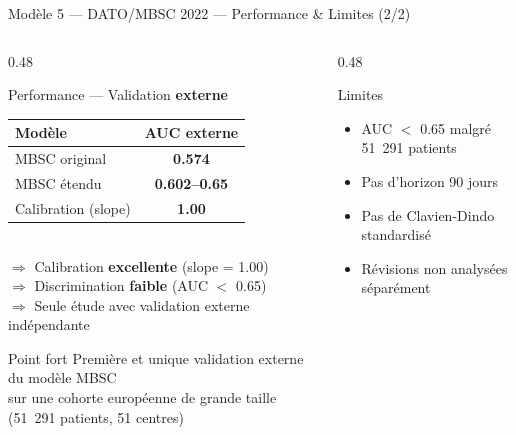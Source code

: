 \documentclass[aspectratio=169]{beamer}
\newcommand{\tightlist}{%
  \setlength{\itemsep}{1pt}\setlength{\parskip}{0pt}%
  \setlength{\parsep}{0pt}\setlength{\topsep}{2pt}}
\begin{document}
\begin{frame}{Modèle 5 --- DATO/MBSC 2022 --- Performance \& Limites (2/2)}
  \begin{columns}[T]
    \begin{column}{0.48\textwidth}
      \begin{block}{Performance --- Validation \textbf{externe}}
        \footnotesize
        \begin{tabular}{lc}
          \toprule
          \textbf{Modèle} & \textbf{AUC externe} \\
          \midrule
          MBSC original       & \textcolor{orangemod}{\textbf{0.574}} \\
          MBSC étendu         & \textcolor{orangemod}{\textbf{0.602--0.65}} \\
          Calibration (slope) & \textcolor{vertdoux}{\textbf{1.00}} \\
          \bottomrule
        \end{tabular}
        \vspace{6pt}\\
        $\Rightarrow$ Calibration \textcolor{vertdoux}{\textbf{excellente}} (slope = 1.00)\\[4pt]
        $\Rightarrow$ Discrimination \textcolor{rougealerte}{\textbf{faible}} (AUC $<$ 0.65)\\[4pt]
        $\Rightarrow$ Seule étude avec validation externe indépendante
      \end{block}
      \vspace{0.3em}
      \begin{exampleblock}{Point fort}
        \footnotesize
        Première et unique validation externe du modèle MBSC\\
        sur une cohorte européenne de grande taille (51~291 patients, 51 centres)
      \end{exampleblock}
    \end{column}
    \begin{column}{0.48\textwidth}
      \begin{alertblock}{Limites}
        \footnotesize\tightlist
        \begin{itemize}\tightlist
          \item AUC $<$ 0.65 malgré 51~291 patients
          \item Pas d'horizon 90 jours
          \item Pas de Clavien-Dindo standardisé
          \item Révisions non analysées séparément

\end{itemize}
\end{alertblock}
\end{column}
\end{columns}
\end{frame}
\end{document}
